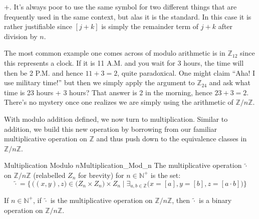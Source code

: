     $+$. It's always poor to use the same symbol for two different
    things that are frequently used in the same context, but alas it is
    the standard. In this case it is rather justifiable since
    $[j+k]$ is simply the remainder term of $j+k$ after division by $n$.
    \begin{example}
        The most common example one comes across of modulo arithmetic is
        in $\mathbb{Z}_{12}$ since this represents a clock. If it is 11
        A.M. and you wait for 3 hours, the time will then be 2 P.M. and
        hence $11+3=2$, quite paradoxical. One might claim ``Aha! I use
        military time!'' but then we simply apply the argument to
        $\mathbb{Z}_{24}$ and ask what time is 23 hours + 3 hours? That
        answer is 2 in the morning, hence $23+3=2$. There's no mystery
        once one realizes we are simply using the arithmetic of
        $\mathbb{Z}/n\mathbb{Z}$.
    \end{example}
    With modulo addition defined, we now turn to multiplication. Similar
    to addition, we build this new operation by borrowing from our
    familiar multiplicative operation on $\mathbb{Z}$ and thus push
    down to the equivalence classes in $\mathbb{Z}/n\mathbb{Z}$.
    \begin{fdefinition}{Multiplication Modulo $n$}{Multiplication_Mod_n}
        The multiplicative operation $\tilde{\cdot}$ on
        $\mathbb{Z}/n\mathbb{Z}$
        (relabelled $Z_{n}$ for brevity) for $n\in\mathbb{N}^{+}$
        is the set:
        \begin{equation*}
            \tilde{\cdot}=\big\{\,\big((x,y),z\big)
                \in\big(Z_{n}\times{Z}_{n}\big)\times{Z}_{n}\;\big|\;
                \exists_{a,b\in\mathbb{Z}}
                \big(x=[a],y=[b],z=[a\cdot{b}]\big)\big\}
        \end{equation*}
    \end{fdefinition}
    \begin{theorem}
        \label{thm:Mult_Mod_n_is_Bin_Op}%
        If $n\in\mathbb{N}^{+}$, if $\tilde{\cdot}$ is the
        multiplicative operation on $\mathbb{Z}/n\mathbb{Z}$, then
        $\tilde{\cdot}$ is a binary operation on
        $\mathbb{Z}/n\mathbb{Z}$.
    \end{theorem}
